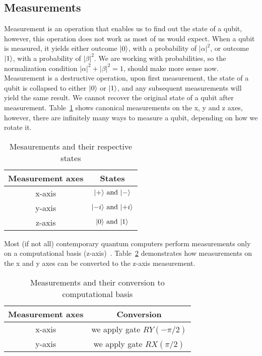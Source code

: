 \subsection*{Measurements}
Measurement is an operation that enables us to find out the state of a qubit, however, this operation does not work as most of us would expect. When a qubit is measured, it yields either outcome $\lvert0\rangle$, with a probability of $\lvert \alpha \rvert^2$, or outcome $\lvert1\rangle$, with a probability of $\lvert \beta \rvert^2$. We are working with probabilities, so the normalization condition $\lvert \alpha \rvert^2 + \lvert \beta \rvert^2 = 1$, should make more sense now. Measurement is a destructive operation, upon first measurement, the state of a qubit is collapsed to either $\lvert0\rangle$ or $\lvert1\rangle$, and any subsequent measurements will yield the same result. We cannot recover the original state of a qubit after measurement. Table~\ref{tab:measurements-states} shows canonical measurements on the x, y and z axes, however, there are infinitely many ways to measure a qubit, depending on how we rotate it.

\begin{table}[H]
  \centering
  \begin{tabular}{|c|c|} 
      \hline
      \multicolumn{1}{|c|}{\textbf{Measurement axes}} & \textbf{States}\\
      \hline
      x-axis & $\lvert+\rangle \text{ and }\lvert-\rangle$\\ 
      \hline
      y-axis & $\lvert-i\rangle \text{ and }\lvert+i\rangle$\\ 
      \hline
      z-axis & $\lvert0\rangle \text{ and }\lvert1\rangle$\\ 
      \hline
  \end{tabular}
  \caption{Mesaurements and their respective states}
  \label{tab:measurements-states}
\end{table}
Most (if not all) contemporary quantum computers perform measurements only on a computational basis (z-axis)~\cite{blog}. Table~\ref{tab:measurements-conversion} demonstrates how measurements on the x and y axes can be converted to the z-axis measurement.
\begin{table}[H]
  \centering
  \begin{tabular}{|c|c|} 
      \hline
      \multicolumn{1}{|c|}{\textbf{Measurement axes}} & \textbf{Conversion}\\
      \hline
      x-axis & we apply gate $RY(-\pi/2)$ \\ 
      \hline
      y-axis & we apply gate $RX(\pi/2)$ \\ 
      \hline
  \end{tabular}
  \caption{Measurements and their conversion to computational basis}
  \label{tab:measurements-conversion}
\end{table}

